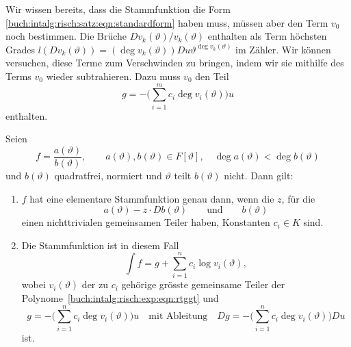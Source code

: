 Wir wissen bereits, dass die Stammfunktion die Form
\eqref{buch:intalg:risch:satz:eqn:standardform}
haben muss, müssen aber den Term $v_0$ noch bestimmen.
Die Brüche $Dv_k(\vartheta)/v_k(\vartheta)$ enthalten als
Term höchsten Grades
$l(Dv_k(\vartheta))=(\deg v_k(\vartheta))Du \vartheta^{\deg v_k(\vartheta)}$
im Zähler.
Wir können versuchen, diese Terme zum Verschwinden zu bringen, indem wir 
sie mithilfe des Terms $v_0$ wieder subtrahieren.
Dazu muss $v_0$ den Teil
\[
g = -\biggl(\sum_{i=1}^m c_i\deg v_i(\vartheta)\biggr) u
\]
enthalten.

\begin{satz}
\label{buch:intalg:risch:satz:rothstein-trager-exponentiell}
Seien
\[
f = \frac{a(\vartheta)}{b(\vartheta)},
\qquad
a(\vartheta),b(\vartheta)\in F[\vartheta],\quad
\deg a(\vartheta)<\deg b(\vartheta)
\]
und $b(\vartheta)$ quadratfrei, normiert und $\vartheta$ teilt $b(\vartheta)$
nicht.
Dann gilt:
\begin{enumerate}
\item $f$ hat eine elementare Stammfunktion genau dann, wenn die $z$,
für die 
\begin{equation}
a(\vartheta)-z\cdot Db(\vartheta)
\qquad\text{und}\qquad
b(\vartheta)
\label{buch:intalg:risch:exp:eqn:rtggt}
\end{equation}
einen nichttrivialen gemeinsamen Teiler haben, Konstanten $c_i \in K$ sind.
\item Die Stammfunktion ist in diesem Fall
\[
\int f
=
g
+
\sum_{i=1}^n c_i \log v_i(\vartheta),
\]
wobei $v_i(\vartheta)$ der zu $c_i$ gehörige grösste gemeinsame Teiler
der Polynome~\eqref{buch:intalg:risch:exp:eqn:rtggt} und
\begin{equation}
g = -\biggl(\sum_{i=1}^n c_i\deg v_i(\vartheta) \biggr) u
\quad\text{mit Ableitung}\quad
Dg = -\biggl(\sum_{i=1}^n c_i\deg v_i(\vartheta) \biggr) Du
\label{buch:intalg:risch:exp:eqn:g}
\end{equation}
ist.
\end{enumerate}
\end{satz}

